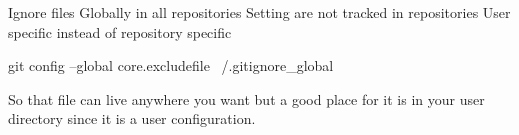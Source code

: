 Ignore files Globally in all repositories 
Setting are not tracked in repositories
User specific instead of repository specific 

git config --global core.excludefile ~/.gitignore_global

So that file can live anywhere you want but a good place for it is in your user directory since it is a user configuration.
